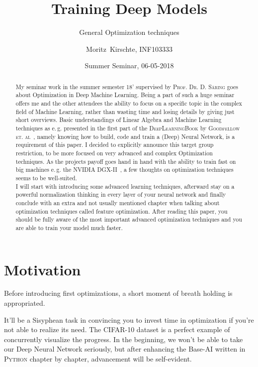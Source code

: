 \documentclass[dvipsnames,twocolumn]{scrartcl}
\title{Training Deep Models}
\subtitle{General Optimization techniques}
\author{Moritz~Kirschte, INF103333}
\date{Summer Seminar, 06-05-2018}
\begin{document}
	
	\maketitle
	
	\begin{abstract}
		
		My seminar work in the summer semester 18' supervised by \textsc{Prof. Dr. D. Säring} goes about Optimization in Deep Machine Learning. Being a part of such a huge seminar offers me and the other attendees the ability to focus on a specific topic in the complex field of Machine Learning, rather than wasting time and losing details by giving just short overviews. Basic understandings of Linear Algebra and Machine Learning techniques as e.\,g. presented in the first part of the \textsc{DeepLearningBook} by \textsc{Goodfellow et. al}~\cite{Goodfellow-et-al-2016}, namely knowing how to build, code and train a (Deep) Neural Network, is a requirement of this paper. I decided to explicitly announce this target group restriction, to be more focused on very advanced and complex Optimization techniques. As the projects payoff goes hand in hand with the ability to train fast on big machines e.\,g. the \textsc{NVIDIA DGX-II}~\cite{nvidia-dgx-ii}, a few thoughts on optimization techniques seems to be well-suited.\\ I will start with introducing some advanced learning techniques, afterward stay on a powerful normalization thinking in every layer of your neural network and finally conclude with an extra and not usually mentioned chapter when talking about optimization techniques called feature optimization. After reading this paper, you should be fully aware of the most important advanced optimization techniques and you are able to train your model much faster.
		
	\end{abstract}
	
	\tableofcontents
	
	\section{Motivation}
	
	Before introducing first optimizations, a short moment of breath holding is appropriated.
	
	It'll be a Sisyphean task in convincing you to invest time in optimization if you're not able to realize its need. The \textsc{CIFAR-10} dataset is a perfect example of concurrently visualize the progress. In the beginning, we won't be able to take our Deep Neural Network seriously, but after enhancing the Base-AI written in \textsc{Python} chapter by chapter, advancement will be self-evident.
	
\end{document}
